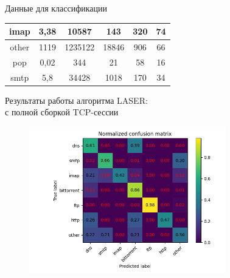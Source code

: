\documentclass[10pt]{beamer}
\begin{document}
\begin{frame}[shrink=5]{Данные для классификации}
\begin{table}[]
{\begin{tabular}{|c|c|c|c|c|c|}
            imap       & 3,38       & 10587              & 143                & 320                              & 74                                  \\ \hline
            other      & 1119       & 1235122            & 18846              & 906                              & 66                                  \\ \hline
            pop        & 0,02       & 344                & 21                 & 58                               & 16                                  \\ \hline
            smtp       & 5,8        & 34428              & 1018               & 170                              & 34                                  \\ \hline
        \end{tabular}}
    \end{table}
\end{frame}

\begin{frame}{Результаты работы алгоритма LASER: \\ с полной сборкой TCP-сессии}
    \begin{figure}
        \begin{adjustwidth}{-2em}{-2em}
            \centering
            \includegraphics[width=23em]{results/lcs/Normalized_confusion_matrix.png}
        \end{adjustwidth}
    \end{figure}
\end{frame}
\end{document}
